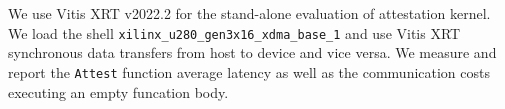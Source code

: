 


We use Vitis XRT v2022.2 for the stand-alone evaluation of \projecttitle{} attestation kernel. We load the shell \texttt{xilinx\_u280\_gen3x16\_xdma\_base\_1} and use Vitis XRT synchronous data transfers from host to device and vice versa. We measure and report the {\tt Attest} function average latency as well as the communication costs executing an empty funcation body.

